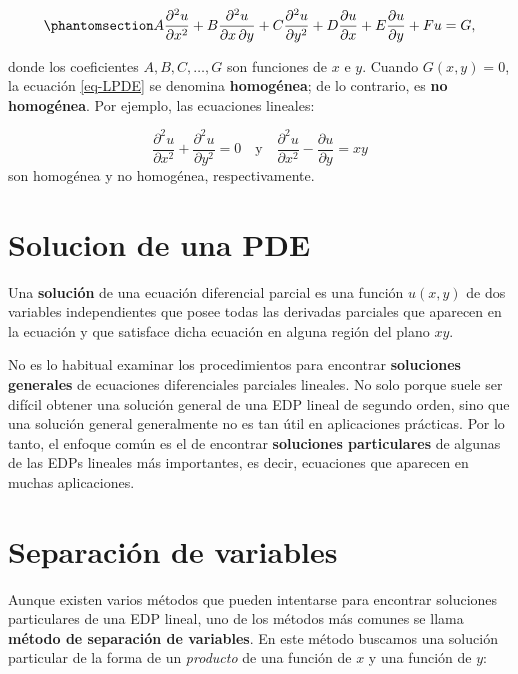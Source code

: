 \documentclass[
  spanish,
  us-letterpaper,
  DIV=11,
  numbers=noendperiod]{scrreprt}
\theoremstyle{plain}
\theoremstyle{definition}
\theoremstyle{remark}
\begin{document}
\begin{equation}\phantomsection\label{eq-LPDE}{
A \dfrac{\partial^2 u}{\partial x^2} + B \dfrac{\partial^2 u}{\partial x \, \partial y} + C \dfrac{\partial^2 u}{\partial y^2} + D \dfrac{\partial u}{\partial x} + E \dfrac{\partial u}{\partial y} + F u = G,
}\end{equation}

donde los coeficientes \(A, B, C, \dots, G\) son funciones de \(x\) e
\(y\). Cuando \(G(x, y) = 0\), la ecuación \ref{eq-LPDE} se denomina
\textbf{homogénea}; de lo contrario, es \textbf{no homogénea}. Por
ejemplo, las ecuaciones lineales:

\[
\dfrac{\partial^2 u}{\partial x^2} + \dfrac{\partial^2 u}{\partial y^2} = 0 \quad\text{y} \quad \dfrac{\partial^2 u}{\partial x^2} - \dfrac{\partial u}{\partial y} = x y
\] son homogénea y no homogénea, respectivamente.

\section{Solucion de una PDE}\label{solucion-de-una-pde}

Una \textbf{solución} de una ecuación diferencial parcial es una función
\(u(x, y)\) de dos variables independientes que posee todas las
derivadas parciales que aparecen en la ecuación y que satisface dicha
ecuación en alguna región del plano \(xy\).

No es lo habitual examinar los procedimientos para encontrar
\textbf{soluciones generales} de ecuaciones diferenciales parciales
lineales. No solo porque suele ser difícil obtener una solución general
de una EDP lineal de segundo orden, sino que una solución general
generalmente no es tan útil en aplicaciones prácticas. Por lo tanto, el
enfoque común es el de encontrar \textbf{soluciones particulares} de
algunas de las EDPs lineales más importantes, es decir, ecuaciones que
aparecen en muchas aplicaciones.

\section{Separación de variables}\label{separaciuxf3n-de-variables}

Aunque existen varios métodos que pueden intentarse para encontrar
soluciones particulares de una EDP lineal, uno de los métodos más
comunes se llama \textbf{método de separación de variables}. En este
método buscamos una solución particular de la forma de un
\emph{producto} de una función de \(x\) y una función de \(y\):
\end{document}
